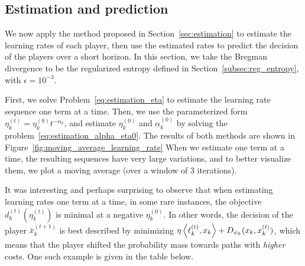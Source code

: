 \documentclass{sig-alternate-ipsn13}
\begin{document}
\subsection{Estimation and prediction}
We now apply the method proposed in Section~\ref{sec:estimation} to estimate the learning rates of each player, then use the estimated rates to predict the decision of the players over a short horizon. In this section, we take the Bregman divergence to be the regularized entropy defined in Section~\ref{subsec:reg_entropy}, with $\epsilon = 10^{-3}$.


First, we solve Problem~\eqref{eq:estimation_eta} to estimate the learning rate sequence one term at a time. Then, we use the parameterized form $\eta^{(t)}_k = \eta_k^{(0)} t^{-\alpha_k}$, and estimate $\eta_k^{(0)}$ and $\alpha_k^{(0)}$ by solving the problem~\ref{eq:estimation_alpha_eta0}. The results of both methods are shown in Figure~\eqref{fig:moving_average_learning_rate}
When we estimate one term at a time, the resulting sequences have very large variations, and to better visualize them, we plot a moving average (over a window of $3$ iterations).

It was interesting and perhaps surprising to observe that when estimating learning rates one term at a time, in some rare instances, the objective $d^{(t)}_k(\eta_k^{(t)})$ is minimal at a negative $\eta_k^{(0)}$. In other words, the decision of the player $\bar x^{(t+1)}_k$ is best described by minimizing $\eta \left\langle \ell^{(t)}_k, x_k \right\rangle + D_{\psi_k}(x_k, x^{(t)}_k)$, which means that the player shifted the probability mass towards paths with \emph{higher} costs. One such example is given in the table below.
\end{document}
